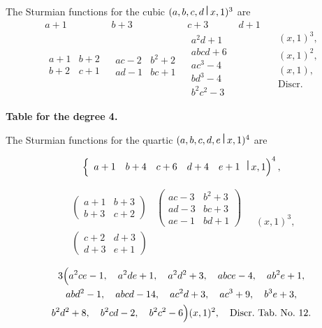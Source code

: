 \documentclass[11pt,a4paper]{book}
\begin{document}
\begin{center}
The Sturmian functions for the cubic $(a,b,c,d\,\raisebox{0.5ex}{\textbf{\textbar}}\,x,1)^3$ are
\[
\begin{array}{c|c|c|c}
a+1 & b+3 & c+3 & d+1 \\ \hline
\begin{array}{cc} a+1 & b+2 \\ b+2 & c+1 \end{array} &
\begin{array}{cc} ac-2 & b^2+2 \\ ad-1 & bc+1 \end{array} &
\begin{array}{c} a^2d+1 \\ abcd+6 \\ ac^3-4 \\ bd^3-4 \\ b^2c^2-3 \end{array}
\end{array}
\quad
\begin{array}{c}
(x,1)^3, \\
(x,1)^2, \\
(x,1), \\
\text{Discr.}
\end{array}
\]

\newpage
\noindent\textbf{Table for the degree 4.}

The Sturmian functions for the quartic $(a,b,c,d,e\,\raisebox{0.5ex}{\textbf{\textbar}}\,x,1)^4$ are

\[
\left\{
\begin{array}{ccccc}
a+1 & b+4 & c+6 & d+4 & e+1
\end{array}
\,\raisebox{0.5ex}{\textbf{\textbar}}\,x,1\right)^4,
\]

\[
\begin{array}{cc}
\begin{pmatrix}
a+1 & b+3 \\
b+3 & c+2
\end{pmatrix} &
\begin{pmatrix}
ac-3 & b^2+3 \\
ad-3 & bc+3 \\
ae-1 & bd+1
\end{pmatrix} \\
\begin{pmatrix}
c+2 & d+3 \\
d+3 & e+1
\end{pmatrix}
\end{array}
\quad
(x,1)^3,
\]

\begin{multline*}
3\Bigl(
a^2ce -1,\quad a^2de+1,\quad a^2d^2+3,\quad abce-4,\quad ab^2e+1,\\
abd^2-1,\quad abcd-14,\quad ac^2d+3,\quad ac^3+9,\quad b^3e+3,\\
b^2d^2+8,\quad b^2cd-2,\quad b^2c^2-6
\Bigr)(x,1)^2,\quad \text{Discr.~Tab.~No.~12.}
\end{multline*}


\end{center}
\end{document}
